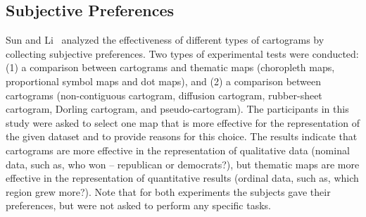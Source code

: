\documentclass{egpubl}
\begin{document}



\subsection{Subjective Preferences}

Sun and Li~\cite{Hui} analyzed the effectiveness of different types of cartograms by collecting subjective preferences. Two types of experimental tests were conducted: (1) a comparison between cartograms and thematic maps (choropleth maps, proportional symbol maps and dot maps), and (2) a comparison between cartograms (non-contiguous cartogram, diffusion cartogram, rubber-sheet cartogram, Dorling cartogram, and pseudo-cartogram). The participants in this study were  asked to select one map that is more effective for the representation of the given dataset and to provide reasons for this choice. 
The results indicate that cartograms are more effective in the representation of qualitative data (nominal data, such as, who won -- republican or democrats?), but thematic maps are more effective in the representation of quantitative results (ordinal data, such as, which region grew more?).
Note that for both experiments 
the subjects gave their preferences, but were not asked to perform any specific tasks.   
\end{document}
